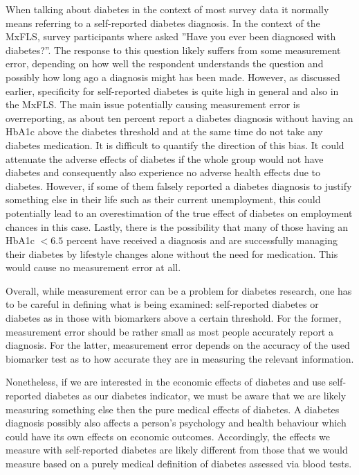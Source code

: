 When talking about diabetes in the context of most survey data it
normally means referring to a self-reported diabetes diagnosis. In
the context of the \ac{MxFLS}, survey participants where asked ''Have
you ever been diagnosed with diabetes?''. The response to this question
likely suffers from some measurement error, depending on how well
the respondent understands the question and possibly how long ago
a diagnosis might has been made. However, as discussed earlier, specificity
for self-reported diabetes is quite high in general and also in the
\ac{MxFLS}. The main issue potentially causing measurement error
is overreporting, as about ten percent report a diabetes diagnosis
without having an \ac{HbA1c} above the diabetes threshold and at
the same time do not take any diabetes medication. It is difficult
to quantify the direction of this bias. It could attenuate the adverse
effects of diabetes if the whole group would not have diabetes and
consequently also experience no adverse health effects due to diabetes.
However, if some of them falsely reported a diabetes diagnosis to
justify something else in their life such as their current unemployment,
this could potentially lead to an overestimation of the true effect
of diabetes on employment chances in this case. Lastly, there is the
possibility that many of those having an \ac{HbA1c} $<6.5$ percent
have received a diagnosis and are successfully managing their diabetes
by lifestyle changes alone without the need for medication. This would
cause no measurement error at all. 

Overall, while measurement error can be a problem for diabetes research,
one has to be careful in defining what is being examined: self-reported
diabetes or diabetes as in those with biomarkers above a certain threshold.
For the former, measurement error should be rather small as most people
accurately report a diagnosis. For the latter, measurement error depends
on the accuracy of the used biomarker test as to how accurate they
are in measuring the relevant information.

Nonetheless, if we are interested in the economic effects of diabetes
and use self-reported diabetes as our diabetes indicator, we must
be aware that we are likely measuring something else then the pure
medical effects of diabetes. A diabetes diagnosis possibly also affects
a person's psychology and health behaviour which could have its own
effects on economic outcomes. Accordingly, the effects we measure with self-reported diabetes are
likely different from those that we would measure based on a purely
medical definition of diabetes assessed via blood tests.


